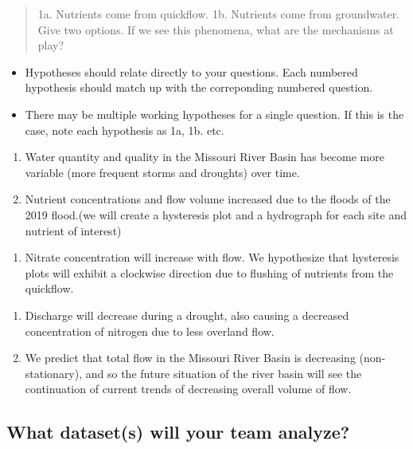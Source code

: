 \documentclass[]{article}
\providecommand{\tightlist}{%
  \setlength{\itemsep}{0pt}\setlength{\parskip}{0pt}}
\begin{document}
\begin{quote}
1a. Nutrients come from quickflow. 1b. Nutrients come from groundwater.
Give two options. If we see this phenomena, what are the mechanisms at
play?
\end{quote}

\begin{itemize}
\tightlist
\item
  Hypotheses should relate directly to your questions. Each numbered
  hypothesis should match up with the correponding numbered question.
\item
  There may be multiple working hypotheses for a single question. If
  this is the case, note each hypothesis as 1a, 1b. etc.
\end{itemize}

\begin{enumerate}
\def\labelenumi{\arabic{enumi}.}
\item
  Water quantity and quality in the Missouri River Basin has become more
  variable (more frequent storms and droughts) over time.
\item
  Nutrient concentrations and flow volume increased due to the floods of
  the 2019 flood.(we will create a hysteresis plot and a hydrograph for
  each site and nutrient of interest)
\end{enumerate}

\begin{enumerate}
\def\labelenumi{\alph{enumi}.}
\tightlist
\item
  Nitrate concentration will increase with flow. We hypothesize that
  hysteresis plots will exhibit a clockwise direction due to flushing of
  nutrients from the quickflow.
\end{enumerate}

\begin{enumerate}
\def\labelenumi{\arabic{enumi}.}
\setcounter{enumi}{2}
\item
  Discharge will decrease during a drought, also causing a decreased
  concentration of nitrogen due to less overland flow.
\item
  We predict that total flow in the Missouri River Basin is decreasing
  (non-stationary), and so the future situation of the river basin will
  see the continuation of current trends of decreasing overall volume of
  flow.
\end{enumerate}

\hypertarget{what-datasets-will-your-team-analyze}{%
\subsection{What dataset(s) will your team
analyze?}\label{what-datasets-will-your-team-analyze}}
\end{document}
